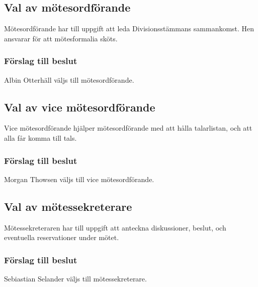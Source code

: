 \documentclass[protokoll]{dvd}
\begin{document}
\subsection{Val av mötesordförande}

Mötesordförande har till uppgift att leda Divisionsstämmans sammankomst.
Hen ansvarar för att mötesformalia sköts.

\subsubsection*{Förslag till beslut}

\begin{attsatser}
	\item Albin Otterhäll väljs till mötesordförande.
\end{attsatser}

\subsection{Val av vice mötesordförande}

Vice mötesordförande hjälper mötesordförande med att hålla talarlistan, och att alla får komma till tals.

\subsubsection*{Förslag till beslut}

\begin{attsatser}
	\item Morgan Thowsen väljs till vice mötesordförande.
\end{attsatser}

\subsection{Val av mötessekreterare}

Mötessekreteraren har till uppgift att anteckna diskussioner, beslut, och eventuella reservationer under mötet.

\subsubsection*{Förslag till beslut}

\begin{attsatser}
	\item Sebiastian Selander väljs till mötessekreterare.
\end{attsatser}
\end{document}
